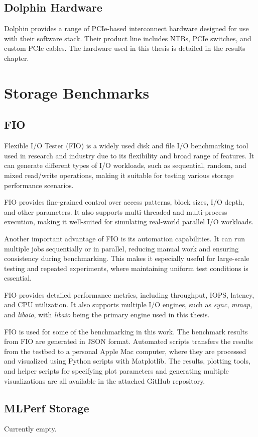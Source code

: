 \subsection{Dolphin Hardware}
Dolphin provides a range of PCIe-based interconnect hardware designed for use with their software stack. Their product line includes NTBs, PCIe switches, and custom PCIe cables. The hardware used in this thesis is detailed in the results chapter.

\section{Storage Benchmarks}

\subsection{FIO}

Flexible I/O Tester (FIO) is a widely used disk and file I/O benchmarking tool used in research and industry due to its flexibility and broad range of features. It can generate different types of I/O workloads, such as sequential, random, and mixed read/write operations, making it suitable for testing various storage performance scenarios.

FIO provides fine-grained control over access patterns, block sizes, I/O depth, and other parameters. It also supports multi-threaded and multi-process execution, making it well-suited for simulating real-world parallel I/O workloads.

Another important advantage of FIO is its automation capabilities. It can run multiple jobs sequentially or in parallel, reducing manual work and ensuring consistency during benchmarking. This makes it especially useful for large-scale testing and repeated experiments, where maintaining uniform test conditions is essential.

FIO provides detailed performance metrics, including throughput, IOPS, latency, and CPU utilization. It also supports multiple I/O engines, such as \textit{sync}, \textit{mmap}, and \textit{libaio}, with \textit{libaio} being the primary engine used in this thesis.

FIO is used for some of the benchmarking in this work. The benchmark results from FIO are generated in JSON format. Automated scripts transfers the results from the testbed to a personal Apple Mac computer, where they are processed and visualized using Python scripts with Matplotlib. The results, plotting tools, and helper scripts for specifying plot parameters and generating multiple visualizations are all available in the attached GitHub repository.

\subsection{MLPerf Storage}
Currently empty.
